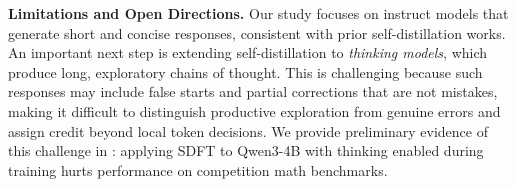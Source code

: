 


\textbf{Limitations and Open Directions.} Our study focuses on instruct models that generate  short and concise responses, consistent with prior self-distillation works. An important next step is extending self-distillation to \emph{thinking models}, which produce long, exploratory chains of thought. This is challenging because such responses may include false starts and partial corrections that are not mistakes, making it difficult to distinguish productive exploration from genuine errors and assign credit beyond local token decisions. We provide preliminary evidence of this challenge in : applying SDFT to Qwen3-4B with thinking enabled during training hurts performance on competition math benchmarks.

